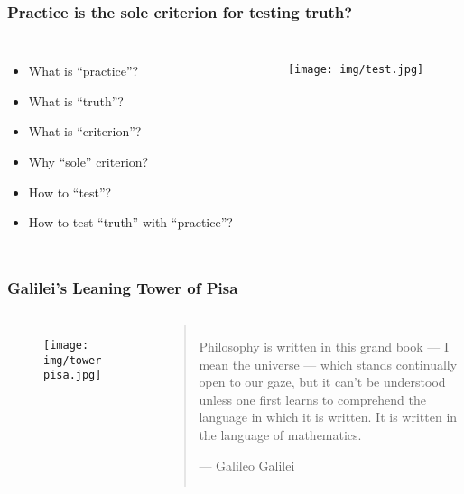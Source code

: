 \documentclass[UTF8,11pt,colorlinks,compress,openany]{beamer}%
\begin{document}
\begin{frame}\frametitle{Practice is the sole criterion for testing truth?}
\centering{}
	\begin{columns}[onlytextwidth]
				\begin{itemize}
					\item What is ``practice''?
					\item What is ``truth''?
					\item What is ``criterion''?
					\item Why ``sole'' criterion?
					\item How to ``test''?
					\item How to test ``truth'' with ``practice''?
				\end{itemize}
			\begin{figure}
				\texttt{[image: img/test.jpg]}
			\end{figure}
	\end{columns}
\end{frame}

\begin{frame}\frametitle{Galilei's Leaning Tower of Pisa}
	\begin{columns}[onlytextwidth]
	\begin{figure}
	\texttt{[image: img/tower-pisa.jpg]}
	\end{figure}
		\begin{quote}
			Philosophy is written in this grand book --- I mean the universe --- which stands continually open to our gaze, but it can't be understood unless one first learns to comprehend the language in which it is written. It is written in the language of mathematics.\par\hfill --- {\textsf{Galileo Galilei}}
		\end{quote}
	\end{columns}
\end{frame}
\end{document}
